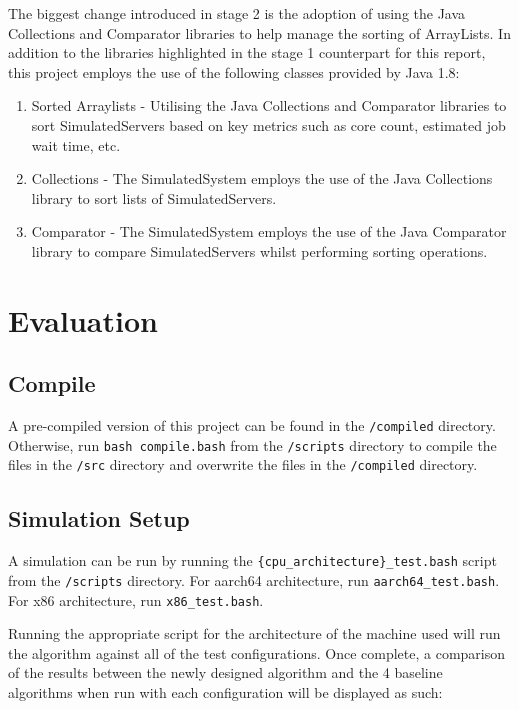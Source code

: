 \documentclass[a4paper]{article}
\begin{document}
The biggest change introduced in stage 2 is the adoption of using the Java Collections and Comparator libraries to help manage the sorting of ArrayLists. In addition to the libraries highlighted in the stage 1 counterpart for this report, this project employs the use of the following classes provided by Java 1.8:
\begin{enumerate}
  \item Sorted Arraylists - Utilising the Java Collections and Comparator libraries to sort SimulatedServers based on key metrics such as core count, estimated job wait time, etc.
  \item Collections - The SimulatedSystem employs the use of the Java Collections library to sort lists of SimulatedServers.
  \item Comparator - The SimulatedSystem employs the use of the Java Comparator library to compare SimulatedServers whilst performing sorting operations.
\end{enumerate}

\section{Evaluation}
\label{sec:section5}
\subsection{Compile}
A pre-compiled version of this project can be found in the \verb|/compiled| directory. Otherwise, run \verb|bash compile.bash| from the \verb|/scripts| directory to compile the files in the \verb|/src| directory and overwrite the files in the \verb|/compiled| directory.

\subsection{Simulation Setup}
A simulation can be run by running the \verb|{cpu_architecture}_test.bash| script from the \verb|/scripts| directory. For aarch64 architecture, run \verb|aarch64_test.bash|. For x86 architecture, run \verb|x86_test.bash|.

Running the appropriate script for the architecture of the machine used will run the algorithm against all of the test configurations. Once complete, a comparison of the results between the newly designed algorithm and the 4 baseline algorithms when run with each configuration will be displayed as such:
\end{document}
